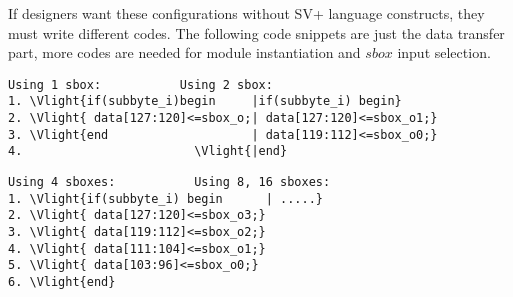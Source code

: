 If designers want these configurations without SV+ language constructs, they must write different codes. The following code snippets are just the data transfer part, more codes are needed for module instantiation and $sbox$ input selection.
\begin{Verbatim}[commandchars=\\\{\}]
   Using 1 sbox:           Using 2 sbox:
1. \Vlight{if(subbyte_i)begin     |if(subbyte_i) begin}
2. \Vlight{ data[127:120]<=sbox_o;| data[127:120]<=sbox_o1;}
3. \Vlight{end                    | data[119:112]<=sbox_o0;}
4.                        \Vlight{|end}    
\end{Verbatim}
\begin{Verbatim}[commandchars=\\\{\}]
   Using 4 sboxes:           Using 8, 16 sboxes:
1. \Vlight{if(subbyte_i) begin      | .....}
2. \Vlight{ data[127:120]<=sbox_o3;}
3. \Vlight{ data[119:112]<=sbox_o2;}
4. \Vlight{ data[111:104]<=sbox_o1;}
5. \Vlight{ data[103:96]<=sbox_o0;}
6. \Vlight{end}
\end{Verbatim}